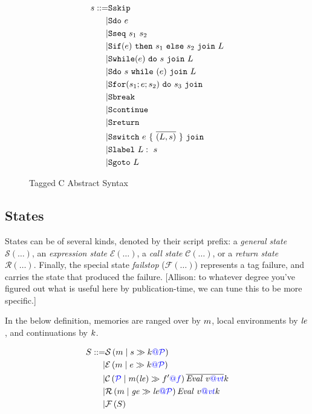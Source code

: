 \documentclass{llncs}
\begin{document}
\begin{figure}
  \begin{subfigure}[t]{0.3\textwidth}
    \[\begin{aligned}
    \stmt ::= & \sskip \\
    | & \sdo{\expr} \\
    | & \sseq{\stmt_1}{\stmt_2} \\
    | & \sifthenelse{\expr}{\stmt_1}{\stmt_2}{L} \\
    | & \swhile{\expr}{\stmt}{L} \\
    | & \sdowhile{\expr}{\stmt}{L} \\
    | & \sfor{\stmt_1}{\expr}{\stmt_2}{\stmt_3} \\
    | & \sbreak \\
    | & \scontinue \\
    | & \sreturn \\
    | & \sswitch{\expr}{\overline{(L,\stmt)}} \\
    | & \slabel{L}{\stmt} \\
    | & \sgoto{L} \\    
    \end{aligned}\]
  \end{subfigure}
  \begin{subfigure}[t]{0.69\textwidth}
  \end{subfigure}
  \caption{Tagged C Abstract Syntax}
  \label{fig:syntax}
\end{figure}

\subsection{States}

States can be of several kinds, denoted by their script prefix: a {\em general state} \(\mathcal{S}(\dots)\),
an {\em expression state} \(\mathcal{E}(\dots)\), a {\em call state} \(\mathcal{C}(\dots)\), or a
{\em return state} \(\mathcal{R}(\dots)\). Finally, the special state {\em failstop} (\(\mathcal{F}(\dots)\))
represents a tag failure, and carries the state that produced the failure.
[Allison: to whatever degree you've figured out what is useful here by publication-time, we can
  tune this to be more specific.]

In the below definition, memories are ranged over by \(\mem\), local environments by
\(\lenv\), and continuations by \(\cont\).

\[\begin{aligned}
S ::= & \sstate{\PCT}{\mem}{\stmt}{\cont} \\
| & \estate{\PCT}{\mem}{\expr}{\cont} \\
| & \cstate{f}{\PCT}{\mem}{\lenv}{f'}{\overline{\val{v}{\vt}}}{\cont} \\
| & \rstate{\PCT}{\mem}{\genv}{\lenv}{\val{v}{\vt}}{\cont} \\
| & \fstate{S} \\
\end{aligned}\]
\end{document}
